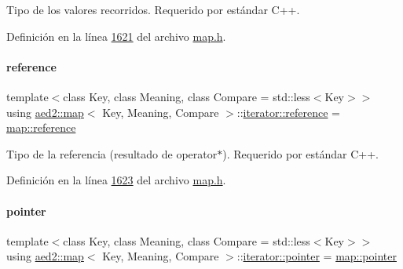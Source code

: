 Tipo de los valores recorridos. Requerido por estándar C++. 



Definición en la línea \hyperlink{map_8h_source_l01621}{1621} del archivo \hyperlink{map_8h_source}{map.\+h}.

\mbox{\label{classaed2_1_1map_1_1iterator_ac19788914a3110897e44c53f1318f6af_ac19788914a3110897e44c53f1318f6af}} 
\paragraph{\texorpdfstring{reference}{reference}}
{\footnotesize\ttfamily template$<$class Key, class Meaning, class Compare = std\+::less$<$\+Key$>$$>$ \\
using \hyperlink{classaed2_1_1map}{aed2\+::map}$<$ Key, Meaning, Compare $>$\+::\hyperlink{classaed2_1_1map_1_1iterator_ac19788914a3110897e44c53f1318f6af_ac19788914a3110897e44c53f1318f6af}{iterator\+::reference} =  \hyperlink{classaed2_1_1map_af4f147533b3c0207ab036c86ce13ec0d_af4f147533b3c0207ab036c86ce13ec0d}{map\+::reference}}



Tipo de la referencia (resultado de operator$\ast$). Requerido por estándar C++. 



Definición en la línea \hyperlink{map_8h_source_l01623}{1623} del archivo \hyperlink{map_8h_source}{map.\+h}.

\mbox{\label{classaed2_1_1map_1_1iterator_a52ea7bdbf1dc6b252aec76633564bdf5_a52ea7bdbf1dc6b252aec76633564bdf5}} 
\paragraph{\texorpdfstring{pointer}{pointer}}
{\footnotesize\ttfamily template$<$class Key, class Meaning, class Compare = std\+::less$<$\+Key$>$$>$ \\
using \hyperlink{classaed2_1_1map}{aed2\+::map}$<$ Key, Meaning, Compare $>$\+::\hyperlink{classaed2_1_1map_1_1iterator_a52ea7bdbf1dc6b252aec76633564bdf5_a52ea7bdbf1dc6b252aec76633564bdf5}{iterator\+::pointer} =  \hyperlink{classaed2_1_1map_a7394e98a23b86bc008ad73326b273fd5_a7394e98a23b86bc008ad73326b273fd5}{map\+::pointer}}



